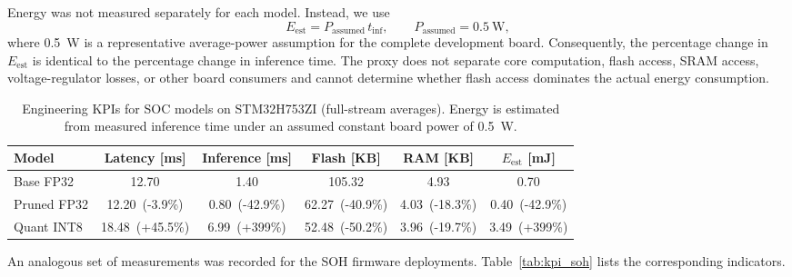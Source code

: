 \documentclass[final,3p,times]{elsarticle}
\begin{document}
Energy was not measured separately for each model. Instead, we use
\begin{equation}
    E_{\mathrm{est}}=P_{\mathrm{assumed}}\,t_{\mathrm{inf}},\qquad P_{\mathrm{assumed}}=\SI{0.5}{\watt},
\end{equation}
where \SI{0.5}{\watt} is a representative average-power assumption for the complete development board. Consequently, the percentage change in $E_{\mathrm{est}}$ is identical to the percentage change in inference time. The proxy does not separate core computation, flash access, SRAM access, voltage-regulator losses, or other board consumers and cannot determine whether flash access dominates the actual energy consumption.
\begin{table}[t!]
      \centering
      \caption{Engineering KPIs for SOC models on STM32H753ZI (full-stream averages). Energy is estimated from measured inference time under an assumed constant board power of \SI{0.5}{\watt}.}
      \label{tab:kpi}
        \begin{tabular}{lccccc}
            \toprule
            Model & Latency [ms] & Inference [ms] & Flash [KB] & RAM [KB] & $E_{\mathrm{est}}$ [mJ] \\
            \midrule
            Base FP32 & 12.70 & 1.40 & 105.32 & 4.93 & 0.70 \\
            Pruned FP32 & 12.20~\textcolor{mgGreen}{(-3.9\%)} & 0.80~\textcolor{mgGreen}{(-42.9\%)} & 62.27~\textcolor{mgGreen}{(-40.9\%)} & 4.03~\textcolor{mgGreen}{(-18.3\%)} & 0.40~\textcolor{mgGreen}{(-42.9\%)} \\
            Quant INT8 & 18.48~\textcolor{mgRed}{(+45.5\%)} & 6.99~\textcolor{mgRed}{(+399\%)} & 52.48~\textcolor{mgGreen}{(-50.2\%)} & 3.96~\textcolor{mgGreen}{(-19.7\%)} & 3.49~\textcolor{mgRed}{(+399\%)} \\
            \bottomrule
        \end{tabular}
  \end{table}
An analogous set of measurements was recorded for the SOH firmware deployments. Table~\ref{tab:kpi_soh} lists the corresponding indicators.
\end{document}
